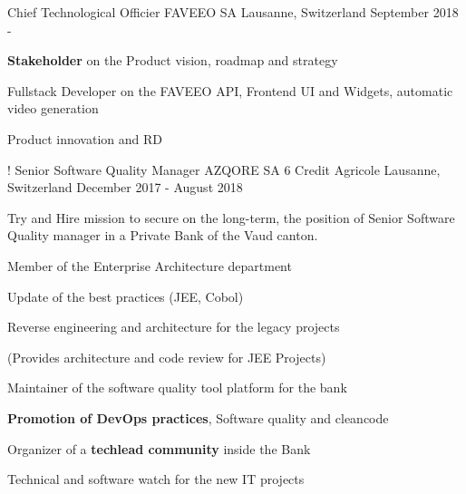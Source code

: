 

\begin{cventries}
    \cventry
    {Chief Technological Officier} %
    {FAVEEO SA} %
    {Lausanne, Switzerland} %
    {September 2018 - } %
    {
        \begin{cvitems} %
            \item{\textbf{Stakeholder} on the Product vision, roadmap and strategy}
            \item{Fullstack Developer on the FAVEEO API, Frontend UI and Widgets, automatic video generation}
            \item{Product innovation and RD}
        \end{cvitems}
    }!
    \cventry
    {Senior Software Quality Manager} %
    {AZQORE SA 6 Credit Agricole} %
    {Lausanne, Switzerland} %
    {December 2017 - August 2018} %
    {
        \begin{cvitems} %
            \item {Try and Hire mission to secure on the long-term, the position of Senior Software Quality manager in a Private Bank of the Vaud canton.}
            \item{Member of the Enterprise Architecture department}
            \item{Update of the best practices (JEE, Cobol)}
            \item{Reverse engineering and architecture for the legacy projects}
            \item(Provides architecture and code review for JEE Projects)
            \item {Maintainer of the software quality tool platform for the bank}
            \item {\textbf{Promotion of DevOps practices}, Software quality and cleancode}
            \item {Organizer of a \textbf{techlead community }inside the Bank}
            \item {Technical and software watch for the new IT projects}

\end{cvitems}}
\end{cventries}
